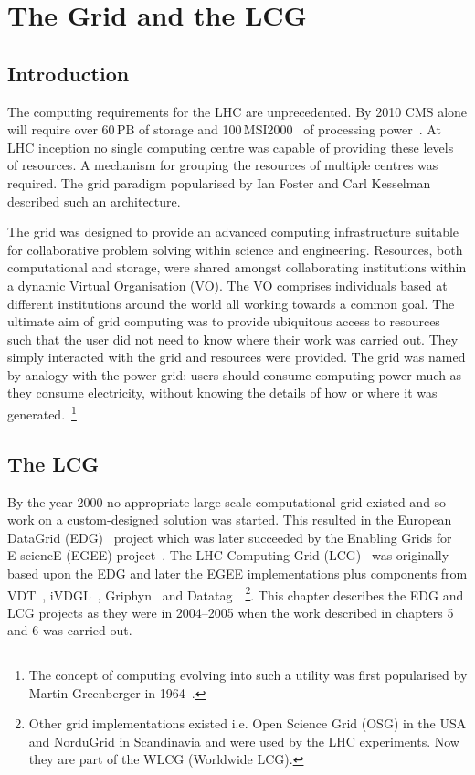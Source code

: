 \chapter{The Grid and the LCG}

\section{Introduction}
The computing requirements for the LHC are unprecedented. By 2010 CMS alone will require over 60\,PB of storage and 100\,MSI2000~\cite{citeulike:847987} of processing power~\cite{CMS_TDR_PHYS_vol1}. At LHC inception no single computing centre was capable of providing these levels of resources. A mechanism for grouping the resources of multiple centres was required. The grid paradigm popularised by Ian Foster and Carl Kesselman~\cite{citeulike:340626} described such an architecture.

The grid was designed to provide an advanced computing infrastructure suitable for collaborative problem solving within science and engineering. Resources, both computational and storage, were shared amongst collaborating institutions within a dynamic Virtual Organisation (VO). The VO comprises individuals based at different institutions around the world all working towards a common goal. The ultimate aim of grid computing was to provide ubiquitous access to resources such that the user did not need to know where their work was carried out. They simply interacted with the grid and resources were provided. The grid was named by analogy with the power grid: users should consume computing power much as they consume electricity, without knowing the details of how or where it was generated.~\footnote{The concept of computing evolving into such a utility was first popularised by Martin Greenberger in 1964~\cite{citeulike:833641}.}

\section{The LCG}
By the year 2000 no appropriate large scale computational grid existed and so work on a custom-designed solution was started. This resulted in the European DataGrid (EDG)~\cite{citeulike:899441} project which was later succeeded by the Enabling Grids for E-sciencE (EGEE) project~\cite{citeulike:899447}. The LHC Computing Grid (LCG)~\cite{LCG_TDR} was originally based upon the EDG and later the EGEE  implementations plus components from VDT~\cite{vdt}, iVDGL~\cite{iVDGL}, Griphyn~\cite{griphyn} and Datatag~\cite{datatag}~\footnote{Other grid implementations existed i.e. Open Science Grid (OSG) in the USA and NorduGrid in Scandinavia and were used by the LHC experiments. Now they are part of the WLCG (Worldwide LCG).}. This chapter describes the EDG and LCG projects as they were in 2004--2005 when the work described in chapters 5 and 6 was carried out.

